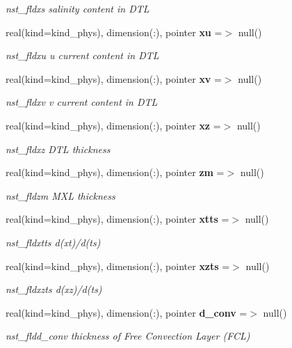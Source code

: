 \begin{DoxyCompactItemize}
\begin{DoxyCompactList}\small\item\em nst\+\_\+fldxs salinity content in D\+TL \end{DoxyCompactList}\item 
real(kind=kind\+\_\+phys), dimension(\+:), pointer \textbf{ xu} =$>$ null()
\begin{DoxyCompactList}\small\item\em nst\+\_\+fldxu u current content in D\+TL \end{DoxyCompactList}\item 
real(kind=kind\+\_\+phys), dimension(\+:), pointer \textbf{ xv} =$>$ null()
\begin{DoxyCompactList}\small\item\em nst\+\_\+fldxv v current content in D\+TL \end{DoxyCompactList}\item 
real(kind=kind\+\_\+phys), dimension(\+:), pointer \textbf{ xz} =$>$ null()
\begin{DoxyCompactList}\small\item\em nst\+\_\+fldxz D\+TL thickness \end{DoxyCompactList}\item 
real(kind=kind\+\_\+phys), dimension(\+:), pointer \textbf{ zm} =$>$ null()
\begin{DoxyCompactList}\small\item\em nst\+\_\+fldzm M\+XL thickness \end{DoxyCompactList}\item 
real(kind=kind\+\_\+phys), dimension(\+:), pointer \textbf{ xtts} =$>$ null()
\begin{DoxyCompactList}\small\item\em nst\+\_\+fldxtts d(xt)/d(ts) \end{DoxyCompactList}\item 
real(kind=kind\+\_\+phys), dimension(\+:), pointer \textbf{ xzts} =$>$ null()
\begin{DoxyCompactList}\small\item\em nst\+\_\+fldxzts d(xz)/d(ts) \end{DoxyCompactList}\item 
real(kind=kind\+\_\+phys), dimension(\+:), pointer \textbf{ d\+\_\+conv} =$>$ null()
\begin{DoxyCompactList}\small\item\em nst\+\_\+fldd\+\_\+conv thickness of Free Convection Layer (F\+CL) \end{DoxyCompactList}\item 

\end{DoxyCompactItemize}
